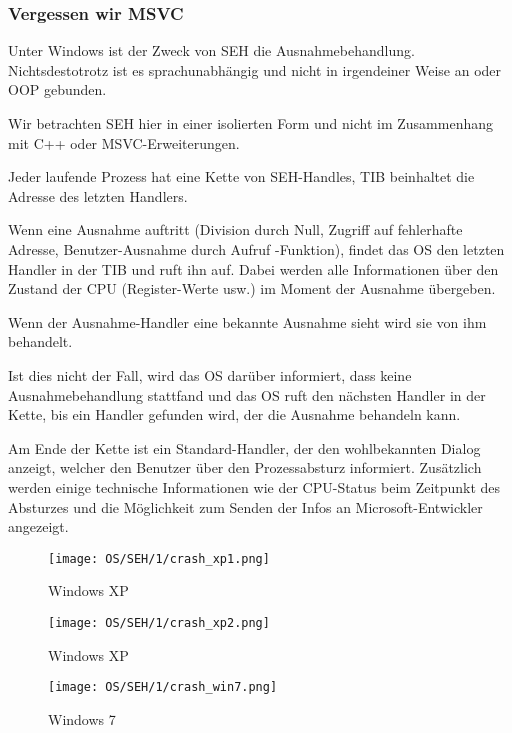 \subsubsection{Vergessen wir MSVC}

Unter Windows ist der Zweck von \ac{SEH} die Ausnahmebehandlung. Nichtsdestotrotz
ist es sprachunabhängig und nicht in irgendeiner Weise an \Cpp oder \ac{OOP} gebunden.

Wir betrachten \ac{SEH} hier in einer isolierten Form und nicht im Zusammenhang mit
C++ oder MSVC-Erweiterungen.


Jeder laufende Prozess hat eine Kette von \ac{SEH}-Handles, \ac{TIB} beinhaltet die Adresse
des letzten Handlers.

Wenn eine Ausnahme auftritt (Division durch Null, Zugriff auf fehlerhafte Adresse,
Benutzer-Ausnahme durch Aufruf -Funktion), findet das \ac{OS} 
den letzten Handler in der \ac{TIB} und ruft ihn auf. Dabei werden alle Informationen
über den Zustand der \ac{CPU} (Register-Werte usw.) im Moment der Ausnahme übergeben.

Wenn der Ausnahme-Handler eine bekannte Ausnahme sieht wird sie von ihm behandelt.

Ist dies nicht der Fall, wird das \ac{OS} darüber informiert, dass keine Ausnahmebehandlung
stattfand und das \ac{OS} ruft den nächsten Handler in der Kette, bis ein Handler
gefunden wird, der die Ausnahme behandeln kann.

Am Ende der Kette ist ein Standard-Handler, der den wohlbekannten Dialog anzeigt,
welcher den Benutzer über den Prozessabsturz informiert. Zusätzlich werden einige
technische Informationen wie der \ac{CPU}-Status beim Zeitpunkt des Absturzes
und die Möglichkeit zum Senden der Infos an Microsoft-Entwickler angezeigt.

\begin{figure}[H]
\centering
\texttt{[image: OS/SEH/1/crash\_xp1.png]}
\caption{Windows XP}
\end{figure}

\begin{figure}[H]
\centering
\texttt{[image: OS/SEH/1/crash\_xp2.png]}
\caption{Windows XP}
\end{figure}

\begin{figure}[H]
\centering
\texttt{[image: OS/SEH/1/crash\_win7.png]}
\caption{Windows 7}
\end{figure}


